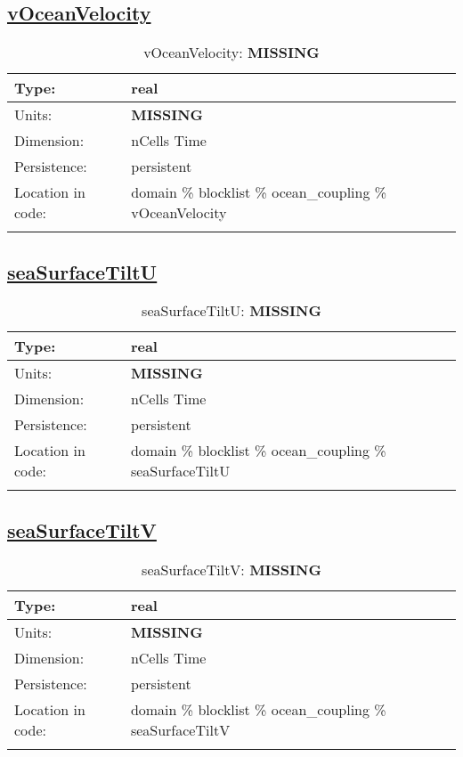 \subsection[vOceanVelocity]{\hyperref[sec:var_tab_ocean_coupling]{vOceanVelocity}}
\label{subsec:var_sec_ocean_coupling_vOceanVelocity}
\begin{center}
\begin{longtable}{| p{2.0in} | p{4.0in} |}
        \hline 
        Type: & real \\
        \hline 
        Units: & {\bf \color{red} MISSING} \\
        \hline 
        Dimension: & nCells Time \\
        \hline 
        Persistence: & persistent \\
        \hline 
         Location in code: & domain \% blocklist \% ocean\_coupling \% vOceanVelocity \\
         \hline 
    \caption{vOceanVelocity: {\bf \color{red} MISSING}}
\end{longtable}
\end{center}
\subsection[seaSurfaceTiltU]{\hyperref[sec:var_tab_ocean_coupling]{seaSurfaceTiltU}}
\label{subsec:var_sec_ocean_coupling_seaSurfaceTiltU}
\begin{center}
\begin{longtable}{| p{2.0in} | p{4.0in} |}
        \hline 
        Type: & real \\
        \hline 
        Units: & {\bf \color{red} MISSING} \\
        \hline 
        Dimension: & nCells Time \\
        \hline 
        Persistence: & persistent \\
        \hline 
         Location in code: & domain \% blocklist \% ocean\_coupling \% seaSurfaceTiltU \\
         \hline 
    \caption{seaSurfaceTiltU: {\bf \color{red} MISSING}}
\end{longtable}
\end{center}
\subsection[seaSurfaceTiltV]{\hyperref[sec:var_tab_ocean_coupling]{seaSurfaceTiltV}}
\label{subsec:var_sec_ocean_coupling_seaSurfaceTiltV}
\begin{center}
\begin{longtable}{| p{2.0in} | p{4.0in} |}
        \hline 
        Type: & real \\
        \hline 
        Units: & {\bf \color{red} MISSING} \\
        \hline 
        Dimension: & nCells Time \\
        \hline 
        Persistence: & persistent \\
        \hline 
         Location in code: & domain \% blocklist \% ocean\_coupling \% seaSurfaceTiltV \\
         \hline 
    \caption{seaSurfaceTiltV: {\bf \color{red} MISSING}}
\end{longtable}
\end{center}
